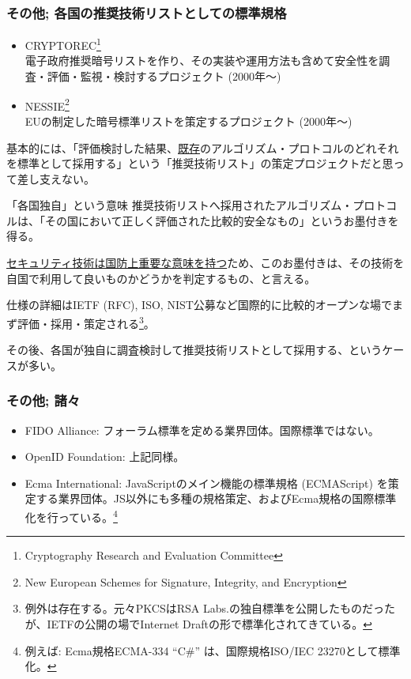 \documentclass[12pt,dvipdfmx]{beamer}
\begin{document}
\begin{frame}
\frametitle{その他; 各国の推奨技術リストとしての標準規格}
\small
\begin{itemize}
 \item CRYPTOREC\footnote[frame]{\scriptsize Cryptography Research and Evaluation Committee} \\
電子政府推奨暗号リストを作り、その実装や運用方法も含めて安全性を調査・評価・監視・検討するプロジェクト (2000年〜)
 \item NESSIE\footnote[frame]{\scriptsize New European Schemes for Signature, Integrity, and Encryption}\\
EUの制定した暗号標準リストを策定するプロジェクト (2000年〜)
\end{itemize}
基本的には、「評価検討した結果、\underline{既存}のアルゴリズム・プロトコルのどれそれを標準として採用する」という\alert{「推奨技術リスト」の策定プロジェクト}だと思って差し支えない。
\end{frame}

\begin{frame}
\small
 
\begin{block}{\small 「各国独自」という意味}
推奨技術リストへ採用されたアルゴリズム・プロトコルは、「その国において正しく評価された比較的安全なもの」というお墨付きを得る。


\underline{セキュリティ技術は国防上重要な意味を持つ}ため、このお墨付きは、その技術を自国で利用して良いものかどうかを判定するもの、と言える。
\end{block}

仕様の詳細はIETF (RFC), ISO, NIST公募など国際的に比較的オープンな場でまず評価・採用・策定される\footnote[frame]{\scriptsize 例外は存在する。元々PKCSはRSA Labs.の独自標準を公開したものだったが、IETFの公開の場でInternet Draftの形で標準化されてきている。}。

\vspace{1ex}

その後、各国が独自に調査検討して推奨技術リストとして採用する、というケースが多い。

\end{frame}

\begin{frame}
\frametitle{その他; 諸々}
\begin{itemize}
 \item FIDO Alliance: フォーラム標準を定める業界団体。国際標準ではない。
 \item OpenID Foundation: 上記同様。
 \item Ecma International: JavaScriptのメイン機能の標準規格 (ECMAScript) を策定する業界団体。JS以外にも多種の規格策定、およびEcma規格の国際標準化を行っている。\footnote[frame]{\scriptsize 例えば: Ecma規格ECMA-334 ``C\#'' は、国際規格ISO/IEC 23270として標準化。}
\end{itemize}
\end{frame}
\end{document}
